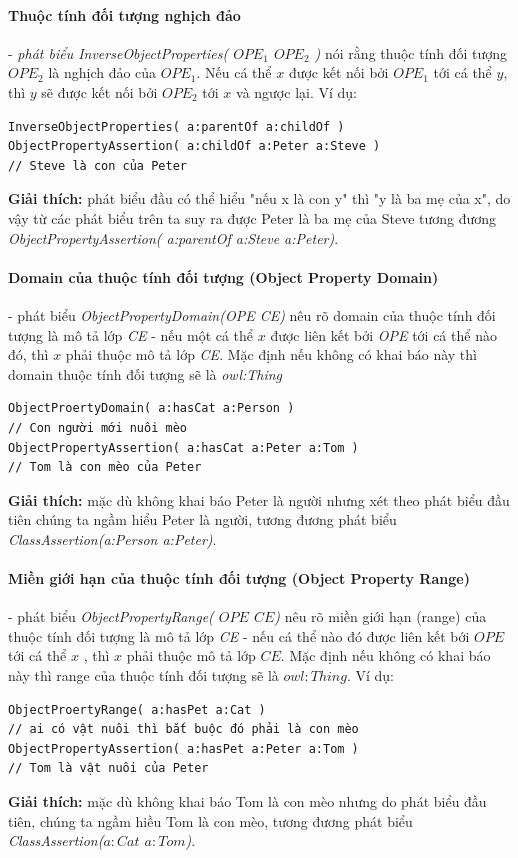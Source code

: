\paragraph{Thuộc tính đối tượng nghịch đảo} - \textit{phát biểu InverseObjectProperties( $OPE_{1}$ $OPE_{2}$ )} nói rằng thuộc tính đối tượng $OPE_{2}$ là nghịch đảo của $OPE_{1}$. Nếu cá thể $x$ được kết nối bởi $OPE_{1}$ tới cá thể $y$, thì $y$ sẽ được kết nối bởi $OPE_{2}$ tới $x$ và ngược lại. Ví dụ:
\begin{verbatim}
InverseObjectProperties( a:parentOf a:childOf )
ObjectPropertyAssertion( a:childOf a:Peter a:Steve ) 
// Steve là con của Peter
\end{verbatim}
\textbf{Giải thích:} phát biểu đầu có thể hiểu "nếu x là con y" thì "y là ba mẹ của x", do vậy từ các phát biểu trên ta suy ra được Peter là ba mẹ của Steve tương đương \textit{ObjectPropertyAssertion( a:parentOf a:Steve a:Peter)}.

\paragraph{Domain của thuộc tính đối tượng (Object Property Domain)} - phát biểu \textit{ObjectPropertyDomain(OPE CE)} nêu rõ domain của thuộc tính đối tượng là mô tả lớp \textit{CE} -  nếu một cá thể $x$ được liên kết bởi \textit{OPE} tới cá thể nào đó, thì $x$ phải thuộc mô tả lớp \textit{CE}. Mặc định nếu không có khai báo này thì domain thuộc tính đối tượng sẽ là \textit{owl:Thing}
\begin{verbatim}
ObjectProertyDomain( a:hasCat a:Person ) 
// Con người mới nuôi mèo
ObjectPropertyAssertion( a:hasCat a:Peter a:Tom ) 
// Tom là con mèo của Peter
\end{verbatim}
\textbf{Giải thích:} mặc dù không khai báo Peter là người nhưng xét theo phát biểu đầu tiên chúng ta ngầm hiểu Peter là người, tương đương phát biểu \textit{ClassAssertion(a:Person a:Peter)}.

\paragraph{Miền giới hạn của thuộc tính đối tượng (Object Property Range)} - phát biểu \textit{ObjectPropertyRange( $OPE$ $CE$)} nêu rõ miền giới hạn (range) của thuộc tính đối tượng là mô tả lớp \textit{CE} -  nếu cá thể nào đó được liên kết bới $OPE$ tới cá thể $x$ , thì $x$ phải thuộc mô tả lớp $CE$. Mặc định nếu không có khai báo này thì range của thuộc tính đối tượng sẽ là $owl:Thing$. Ví dụ:
\begin{verbatim}
ObjectProertyRange( a:hasPet a:Cat ) 
// ai có vật nuôi thì bắt buộc đó phải là con mèo
ObjectPropertyAssertion( a:hasPet a:Peter a:Tom ) 
// Tom là vật nuôi của Peter
\end{verbatim}
\textbf{Giải thích:} mặc dù không khai báo Tom là con mèo nhưng do phát biểu đầu tiên, chúng ta ngầm hiều Tom là con mèo, tương đương phát biểu \textit{ClassAssertion($a:Cat$ $a:Tom$)}.

